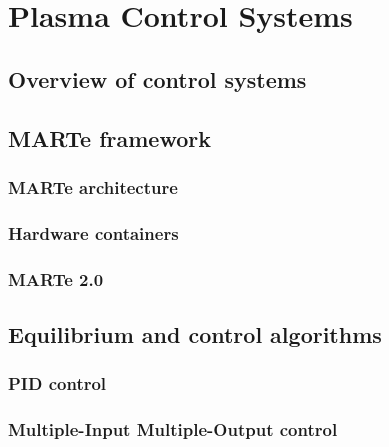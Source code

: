 \chapter{Plasma Control Systems}

\section{Overview of control systems}

\section{MARTe framework}
\subsection{MARTe architecture }
\subsection{Hardware containers}
\subsection{MARTe 2.0}
\section{Equilibrium and control algorithms} 
\subsection{PID control}
\subsection{Multiple-Input Multiple-Output control}